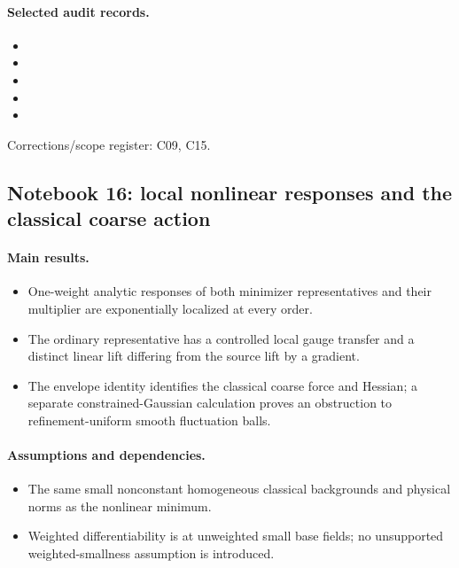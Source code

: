 \documentclass[11pt]{article}
\theoremstyle{remark}
\begin{document}
\paragraph{Selected audit records.}
\begingroup\small
\begin{itemize}
\item {}
\item {}
\item {}
\item {}
\item {}
\end{itemize}
\endgroup
Corrections/scope register: C09, C15.\par

\subsection{Notebook 16: local nonlinear responses and the classical coarse action}
\label{hnc-16}
\noindent{}\par

\paragraph{Main results.}
\begin{itemize}
\item One-weight analytic responses of both minimizer representatives and their multiplier are exponentially localized at every order.
\item The ordinary representative has a controlled local gauge transfer and a distinct linear lift differing from the source lift by a gradient.
\item The envelope identity identifies the classical coarse force and Hessian; a separate constrained-Gaussian calculation proves an obstruction to refinement-uniform smooth fluctuation balls.
\end{itemize}

\paragraph{Assumptions and dependencies.}
\begin{itemize}
\item The same small nonconstant homogeneous classical backgrounds and physical norms as the nonlinear minimum.
\item Weighted differentiability is at unweighted small base fields; no unsupported weighted-smallness assumption is introduced.
\end{itemize}
\end{document}
